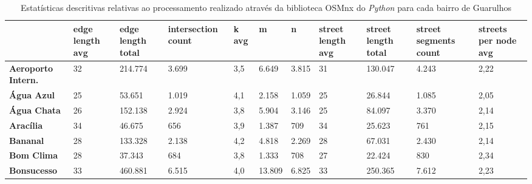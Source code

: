 \begin{spacing}{1}
\begin{landscape}
\begin{table}[H]
    \caption{Estatísticas descritivas relativas ao processamento realizado através da biblioteca OSMnx do \textit{Python} para cada bairro de Guarulhos}
    \begin{tabular}{|p{4cm}|p{1.5cm}p{2cm}p{2cm}p{1.5cm}p{1cm}p{1cm}p{1.5cm}p{2.5cm}p{1.5cm}p{1.5cm}|} %
    \hline
    \rowcolor[HTML]{000000} 
    \multicolumn{1}{|c|}{\cellcolor[HTML]{BFBFBF}{\color[HTML]{000000} \textbf{Name}}} &
      {\cellcolor[HTML]{BFBFBF} \color[HTML]{000000} \textbf{edge length avg}} &
      {\cellcolor[HTML]{BFBFBF} \color[HTML]{000000} \textbf{edge length total}} &
      {\cellcolor[HTML]{BFBFBF} \color[HTML]{000000} \textbf{intersection count}} &
      {\cellcolor[HTML]{BFBFBF} \color[HTML]{000000} \textbf{k avg}} &
      {\cellcolor[HTML]{BFBFBF} \color[HTML]{000000} \textbf{m}} &
      {\cellcolor[HTML]{BFBFBF} \color[HTML]{000000} \textbf{n}} &
      {\cellcolor[HTML]{BFBFBF} \color[HTML]{000000} \textbf{street length avg}} &
      {\cellcolor[HTML]{BFBFBF} \color[HTML]{000000} \textbf{street length total}} &
      {\cellcolor[HTML]{BFBFBF} \color[HTML]{000000} \textbf{street segments count}} &
      {\cellcolor[HTML]{BFBFBF} \color[HTML]{000000} \textbf{streets per node avg}} \\ \hline
    \textbf{Aeroporto Intern.}       & 32 & 214.774 & 3.699 & 3,5 & 6.649  & 3.815 & 31 & 130.047 & 4.243  & 2,22 \\
    \textbf{Água Azul}               & 25 & 53.651  & 1.019 & 4,1 & 2.158  & 1.059 & 25 & 26.844  & 1.085  & 2,05 \\
    \textbf{Água Chata}              & 26 & 152.138 & 2.924 & 3,8 & 5.904  & 3.146 & 25 & 84.097  & 3.370  & 2,14 \\
    \textbf{Aracília}                & 34 & 46.675  & 656   & 3,9 & 1.387  & 709   & 34 & 25.623  & 761    & 2,15 \\
    \textbf{Bananal}                 & 28 & 133.328 & 2.138 & 4,2 & 4.818  & 2.269 & 28 & 67.031  & 2.430  & 2,14 \\
    \textbf{Bom Clima}               & 28 & 37.343  & 684   & 3,8 & 1.333  & 708   & 27 & 22.424  & 830    & 2,34 \\
    \textbf{Bonsucesso}              & 33 & 460.881 & 6.515 & 4,0 & 13.809 & 6.825 & 33 & 250.365 & 7.612  & 2,23 \\

\end{tabular}
\end{table}
\end{landscape}
\end{spacing}
